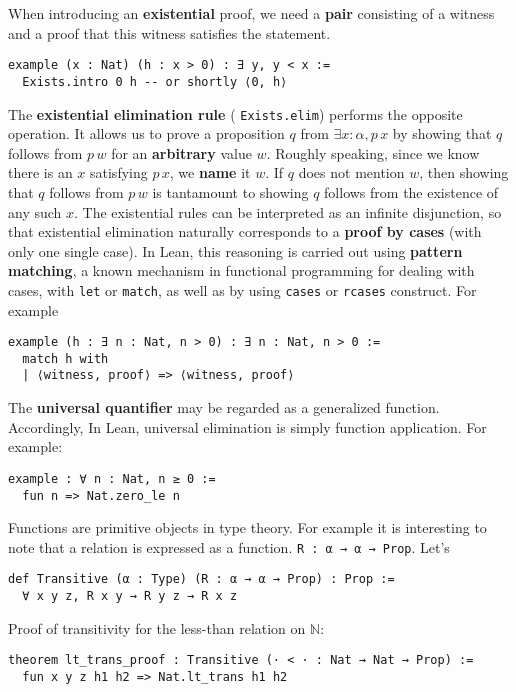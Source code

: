 When introducing an \textbf{existential} proof, 
we need a \textbf{pair} consisting 
of a witness and a proof that this witness 
satisfies the statement.
\begin{lstlisting}[language=lean]
example (x : Nat) (h : x > 0) : ∃ y, y < x :=
  Exists.intro 0 h -- or shortly ⟨0, h⟩
\end{lstlisting}
The \textbf{existential elimination rule} 
( \lstinline[language=lean]|Exists.elim|) performs the opposite operation. 
It allows us to prove a proposition \(q\) 
from \(\exists x : \alpha, p\,x\) by showing 
that \(q\) follows from \(p\,w\) for an \textbf{arbitrary} 
value \(w\).
Roughly speaking, since we know there is an \(x\) 
satisfying \(p\,x\), we \textbf{name} it \(w\). 
If \(q\) does not mention \(w\), then showing that \(q\) 
follows from \(p\,w\) is tantamount to showing \(q\) 
follows from the existence of any such \(x\).
The existential rules can be interpreted as an infinite 
disjunction, 
so that existential elimination naturally corresponds to a \textbf{proof by cases} (with only one single case). 
In Lean, this reasoning is carried out using \textbf{pattern matching}, 
a known mechanism in functional programming for dealing with cases,  
with \lstinline[language=lean]|let| or \lstinline[language=lean]|match|, as well as by using \lstinline[language=lean]|cases| or 
\lstinline[language=lean]|rcases| construct. 
For example
\begin{lstlisting}[language=lean]
example (h : ∃ n : Nat, n > 0) : ∃ n : Nat, n > 0 :=
  match h with
  | ⟨witness, proof⟩ => ⟨witness, proof⟩
\end{lstlisting}
The \textbf{universal quantifier} may be regarded as a generalized function.
Accordingly, In Lean, universal elimination is simply function application.
For example:
\begin{lstlisting}[language=lean]
example : ∀ n : Nat, n ≥ 0 :=
  fun n => Nat.zero_le n
\end{lstlisting}

Functions are primitive objects in type theory.
For example it is interesting to note that a relation is expressed as a function.
\lstinline[language=lean]|R : α → α → Prop|.
Let's 

\begin{lstlisting}[language=lean]
def Transitive (α : Type) (R : α → α → Prop) : Prop :=
  ∀ x y z, R x y → R y z → R x z
\end{lstlisting}
Proof of transitivity for the less-than relation on \(\mathbb{N}\):
\begin{lstlisting}[language=lean]
theorem lt_trans_proof : Transitive (· < · : Nat → Nat → Prop) :=
  fun x y z h1 h2 => Nat.lt_trans h1 h2
\end{lstlisting}

